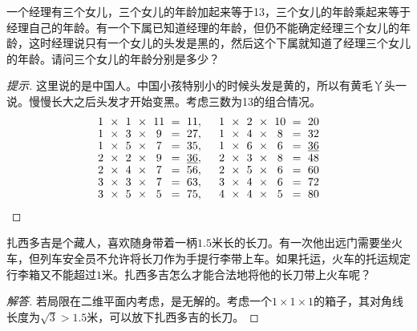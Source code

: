 \begin{question}
  一个经理有三个女儿，三个女儿的年龄加起来等于13，三个女儿的年龄乘起来等于经理自己的年龄。有一个下属已知道经理的年龄，但仍不能确定经理三个女儿的年龄，这时经理说只有一个女儿的头发是黑的，然后这个下属就知道了经理三个女儿的年龄。请问三个女儿的年龄分别是多少？
\end{question}
\begin{proof}[提示]\let\qed\relax%
  这里说的是中国人。中国小孩特别小的时候头发是黄的，所以有黄毛丫头一说。慢慢长大之后头发才开始变黑。考虑三数为13的组合情况。
  \begin{align*}\setlength\arraycolsep{3pt}\renewcommand*{\arraystretch}{.9}
    \begin{array}{cccccccccccccc}
      1 & \times & 1 & \times & 11 & = & 11, &\quad
      1 & \times & 2 & \times & 10 & = & 20\\
      1 & \times & 3 & \times &  9 & = & 27, &\quad
      1 & \times & 4 & \times &  8 & = & 32\\
      1 & \times & 5 & \times &  7 & = & 35, &\quad
      1 & \times & 6 & \times &  6 & = & \underline{36}\\
      2 & \times & 2 & \times &  9 & = & \underline{36}, &\quad
      2 & \times & 3 & \times &  8 & = & 48\\
      2 & \times & 4 & \times &  7 & = & 56, &\quad
      2 & \times & 5 & \times &  6 & = & 60\\
      3 & \times & 3 & \times &  7 & = & 63, &\quad
      3 & \times & 4 & \times &  6 & = & 72\\
      3 & \times & 5 & \times &  5 & = & 75, &\quad
      4 & \times & 4 & \times &  5 & = & 80
    \end{array}
  \end{align*}
\end{proof}

\begin{example}
  扎西多吉是个藏人，喜欢随身带着一柄$1.5$米长的长刀。有一次他出远门需要坐火车，但列车安全员不允许将长刀作为手提行李带上车。如果托运，火车的托运规定行李箱又不能超过$1$米。扎西多吉怎么才能合法地将他的长刀带上火车呢？
\end{example}
\begin{proof}[解答]
若局限在二维平面内考虑，是无解的。考虑一个$1\times1\times1$的箱子，其对角线长度为$\sqrt3>1.5$米，可以放下扎西多吉的长刀。
\end{proof}


